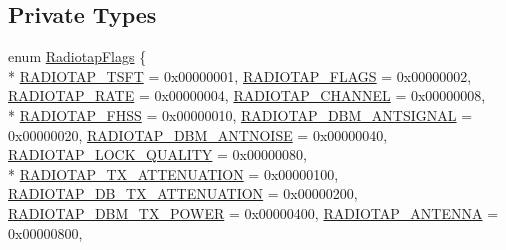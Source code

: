 \subsection*{Private Types}
\begin{DoxyCompactItemize}
\item 
enum \hyperlink{classns3_1_1RadiotapHeader_afd15dfe66387dfbcbf62865d024f58ff}{Radiotap\+Flags} \{ \\*
\hyperlink{classns3_1_1RadiotapHeader_afd15dfe66387dfbcbf62865d024f58ffa5d2d063cf0cde637163d08de441ffa80}{R\+A\+D\+I\+O\+T\+A\+P\+\_\+\+T\+S\+FT} = 0x00000001, 
\hyperlink{classns3_1_1RadiotapHeader_afd15dfe66387dfbcbf62865d024f58ffa8b6ce6db8d735a4c6208c92e3d93eb49}{R\+A\+D\+I\+O\+T\+A\+P\+\_\+\+F\+L\+A\+GS} = 0x00000002, 
\hyperlink{classns3_1_1RadiotapHeader_afd15dfe66387dfbcbf62865d024f58ffa44ade5d74dfc8c2dbf9220a9159eec4f}{R\+A\+D\+I\+O\+T\+A\+P\+\_\+\+R\+A\+TE} = 0x00000004, 
\hyperlink{classns3_1_1RadiotapHeader_afd15dfe66387dfbcbf62865d024f58ffa5c4f6e0dfdd30262fa7e540da0d5d578}{R\+A\+D\+I\+O\+T\+A\+P\+\_\+\+C\+H\+A\+N\+N\+EL} = 0x00000008, 
\\*
\hyperlink{classns3_1_1RadiotapHeader_afd15dfe66387dfbcbf62865d024f58ffadf4930c932ce5e80f70b508489fea9ab}{R\+A\+D\+I\+O\+T\+A\+P\+\_\+\+F\+H\+SS} = 0x00000010, 
\hyperlink{classns3_1_1RadiotapHeader_afd15dfe66387dfbcbf62865d024f58ffa39a11e0a6b45b0cedcedcaa4adc6a0eb}{R\+A\+D\+I\+O\+T\+A\+P\+\_\+\+D\+B\+M\+\_\+\+A\+N\+T\+S\+I\+G\+N\+AL} = 0x00000020, 
\hyperlink{classns3_1_1RadiotapHeader_afd15dfe66387dfbcbf62865d024f58ffae23bc8a9f7c31fed309f83d9fb47303e}{R\+A\+D\+I\+O\+T\+A\+P\+\_\+\+D\+B\+M\+\_\+\+A\+N\+T\+N\+O\+I\+SE} = 0x00000040, 
\hyperlink{classns3_1_1RadiotapHeader_afd15dfe66387dfbcbf62865d024f58ffaf7e272e231381bb96c1249d3e5bc3f34}{R\+A\+D\+I\+O\+T\+A\+P\+\_\+\+L\+O\+C\+K\+\_\+\+Q\+U\+A\+L\+I\+TY} = 0x00000080, 
\\*
\hyperlink{classns3_1_1RadiotapHeader_afd15dfe66387dfbcbf62865d024f58ffac37dba53d249adeeb099272e90737893}{R\+A\+D\+I\+O\+T\+A\+P\+\_\+\+T\+X\+\_\+\+A\+T\+T\+E\+N\+U\+A\+T\+I\+ON} = 0x00000100, 
\hyperlink{classns3_1_1RadiotapHeader_afd15dfe66387dfbcbf62865d024f58ffa9711d2d12b4ba6ff71a85711e2c8b5da}{R\+A\+D\+I\+O\+T\+A\+P\+\_\+\+D\+B\+\_\+\+T\+X\+\_\+\+A\+T\+T\+E\+N\+U\+A\+T\+I\+ON} = 0x00000200, 
\hyperlink{classns3_1_1RadiotapHeader_afd15dfe66387dfbcbf62865d024f58ffa5f2ae8d187d9e12a5f253dddd4426c38}{R\+A\+D\+I\+O\+T\+A\+P\+\_\+\+D\+B\+M\+\_\+\+T\+X\+\_\+\+P\+O\+W\+ER} = 0x00000400, 
\hyperlink{classns3_1_1RadiotapHeader_afd15dfe66387dfbcbf62865d024f58ffaa440618ab1f857767691342a07af46f9}{R\+A\+D\+I\+O\+T\+A\+P\+\_\+\+A\+N\+T\+E\+N\+NA} = 0x00000800, 

\end{DoxyCompactItemize}
